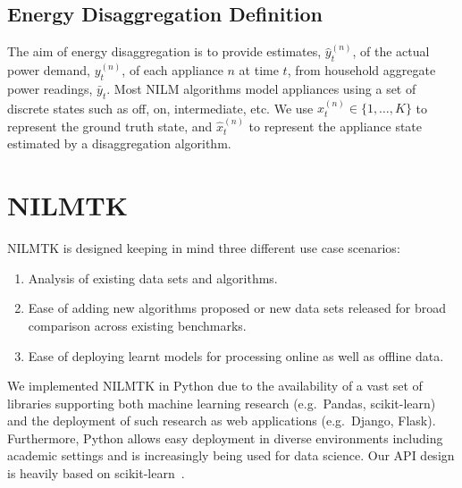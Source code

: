 \documentclass{sig-alternate}
\newcommand{\bluecolor}[1]{\textcolor{blue}{#1}}
\newcommand{\secref}[1]{Section~\ref{#1}}
\begin{document}
\subsection{Energy Disaggregation Definition}
\label{sec:notation}
\noindent The aim of energy disaggregation is to provide estimates, $\hat{y}^{(n)}_t$, of the actual power demand, $y^{(n)}_t$, of each appliance $n$ at time $t$, from household aggregate power readings, $\bar{y}_t$. Most NILM algorithms model appliances using a set of discrete states such as off, on, intermediate, etc.  We use $x^{(n)}_t \in \{1, \dots, K\}$ to represent the ground truth state, and $\hat{x}^{(n)}_t$ to represent the appliance state estimated by a disaggregation algorithm.

\section{NILMTK}
\label{sec:nilmtk}

\noindent
NILMTK is designed keeping in mind three different use case scenarios:
\begin{enumerate}
\item Analysis of existing data sets and algorithms.
\item Ease of adding new algorithms proposed or new data sets released for broad comparison across existing benchmarks.
\item Ease of deploying learnt models for processing online as well as offline data.
\end{enumerate}


We implemented NILMTK in Python due to the availability of a vast set of libraries supporting both machine learning research (e.g.\ Pandas, scikit-learn) and the deployment of such research as web applications (e.g.\ Django, Flask). Furthermore, Python allows easy deployment in diverse environments including academic settings and is increasingly being used for data science.
Our API design is heavily based on scikit-learn~\cite{scikit, scikit_api}.
\end{document}
